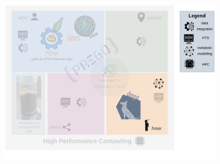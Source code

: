 \documentclass{beamer}
\begin{document}
\begin{darkframes}
\begin{frame}
\begin{textblock*}{10cm}
         \end{textblock*}









      \end{frame} 
   \end{darkframes}

   \begin{frame}
      \includegraphics[width=115mm]{resources/phd_graphical_abstract-dingo.png}
   \end{frame}
\end{document}
